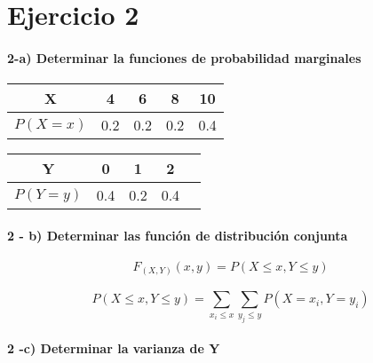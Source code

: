 \documentclass[12pt]{article}
\begin{document}
    \section*{Ejercicio 2} 

    \paragraph*{2-a) Determinar la funciones de probabilidad marginales }

    \begin{center}   
        \begin{tabular}{|c|c|c|c|c|}
            \hline
            X                  & 4  & 6  &  8 & 10
            \\\hline
            $P\left(X=x\right)$   & 0.2  & 0.2  &  0.2 & 0.4
            \\
            \hline
        \end{tabular}

        \vspace*{0.5cm}
        \begin{tabular}{|c|c|c|c|c|}
            \hline
            Y                  & 0  & 1  &  2
            \\\hline
            $P\left(Y=y\right)$   & 0.4  & 0.2  &  0.4 
            \\
            \hline
        \end{tabular}
    \end{center}

    \paragraph*{2 - b) Determinar las funci\'on de distribuci\'on conjunta} 

    \begin{equation*}
        F_{\left(X,Y\right)} \left(x,y\right) = P \left(X \le x , Y \le y\right)
    \end{equation*}

    \begin{equation*}
        P \left(X \le x , Y \le y\right) =  \sum_{x_i \le x}^{} \sum_{y_j \le y}^{}  P \left(X = x_i , Y = y_i\right)  
    \end{equation*}



    \paragraph*{2 -c) Determinar la varianza de Y}
\end{document}
